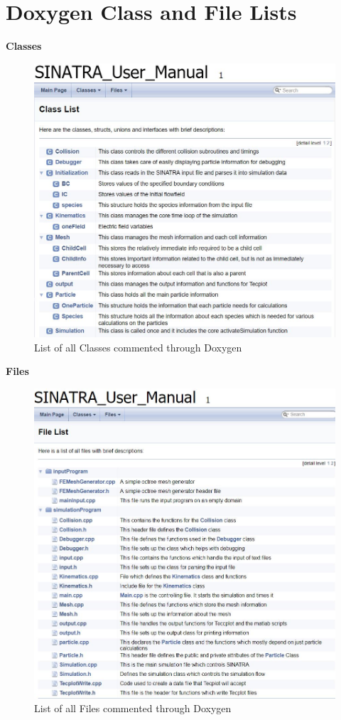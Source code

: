 \chapter{Doxygen Class and File Lists}
\label{app:doxygenlists}


\textbf{Classes}
\begin{figure}[h]
\includegraphics[width=.95\textwidth]{figures/ClassList.JPG}
\centering
\caption{List of all Classes commented through Doxygen}
\label{fig:ClassList}
\end{figure}


\newpage
\textbf{Files}
\begin{figure}[h]
\includegraphics[width=.95\textwidth]{figures/FileList.JPG}
\centering
\caption{List of all Files commented through Doxygen}
\label{fig:FileList}
\end{figure}


